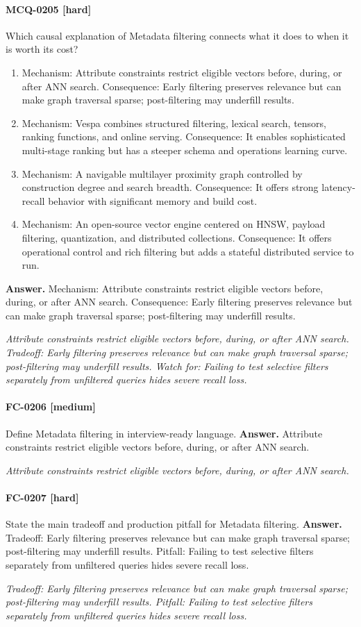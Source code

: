 \paragraph{MCQ-0205 [hard]} Which causal explanation of Metadata filtering connects what it does to when it is worth its cost?
\begin{enumerate}[label=\Alph*.]
\item Mechanism: Attribute constraints restrict eligible vectors before, during, or after ANN search. Consequence: Early filtering preserves relevance but can make graph traversal sparse; post-filtering may underfill results.
\item Mechanism: Vespa combines structured filtering, lexical search, tensors, ranking functions, and online serving. Consequence: It enables sophisticated multi-stage ranking but has a steeper schema and operations learning curve.
\item Mechanism: A navigable multilayer proximity graph controlled by construction degree and search breadth. Consequence: It offers strong latency-recall behavior with significant memory and build cost.
\item Mechanism: An open-source vector engine centered on HNSW, payload filtering, quantization, and distributed collections. Consequence: It offers operational control and rich filtering but adds a stateful distributed service to run.
\end{enumerate}
\noindent\textbf{Answer.} Mechanism: Attribute constraints restrict eligible vectors before, during, or after ANN search. Consequence: Early filtering preserves relevance but can make graph traversal sparse; post-filtering may underfill results.
\par\textit{Attribute constraints restrict eligible vectors before, during, or after ANN search. Tradeoff: Early filtering preserves relevance but can make graph traversal sparse; post-filtering may underfill results. Watch for: Failing to test selective filters separately from unfiltered queries hides severe recall loss.}
\paragraph{FC-0206 [medium]} Define Metadata filtering in interview-ready language.
\noindent\textbf{Answer.} Attribute constraints restrict eligible vectors before, during, or after ANN search.
\par\textit{Attribute constraints restrict eligible vectors before, during, or after ANN search.}
\paragraph{FC-0207 [hard]} State the main tradeoff and production pitfall for Metadata filtering.
\noindent\textbf{Answer.} Tradeoff: Early filtering preserves relevance but can make graph traversal sparse; post-filtering may underfill results. Pitfall: Failing to test selective filters separately from unfiltered queries hides severe recall loss.
\par\textit{Tradeoff: Early filtering preserves relevance but can make graph traversal sparse; post-filtering may underfill results. Pitfall: Failing to test selective filters separately from unfiltered queries hides severe recall loss.}
